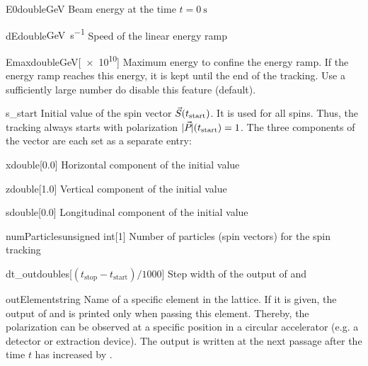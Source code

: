 \documentclass[a4paper]{scrartcl}
\begin{document}
\begin{configdoc}{E0}{double}{\si{\GeV}}
  Beam energy at the time $t=\SI{0}{\s}$
\end{configdoc}

\begin{configdoc}{dE}{double}{\si{\GeV\per\s}}
  Speed of the linear energy ramp
\end{configdoc}

\begin{configdoc}{Emax}{double}{\si{\GeV}}[\num{e10}]
  Maximum energy to confine the energy ramp.
  If the energy ramp reaches this energy, it is kept until the end of the tracking. Use a
  sufficiently large number do disable this feature (default).
\end{configdoc}

\begin{configdocgroup}{s_start}
  Initial value of the spin vector $\vec{S}_{}(t_\text{start})$. It is used for all spins.
  Thus, the tracking always starts with polarization $|\vec{P}_{}|(t_\text{start}) = 1$. The
  three components of the vector are each set as a separate entry:
  
  \begin{configdoc}{x}{double}{}[0.0]
    Horizontal component \sx of the initial value
  \end{configdoc}

  \begin{configdoc}{z}{double}{}[1.0]
    Vertical component \sz of the initial value
  \end{configdoc}

  \begin{configdoc}{s}{double}{}[0.0]
    Longitudinal component \slong of the initial value
  \end{configdoc}
\end{configdocgroup}

\begin{configdoc}{numParticles}{unsigned int}{}[1]
  Number of particles (spin vectors) for the spin tracking
\end{configdoc}

\begin{configdoc}{dt_out}{double}{\si{\s}}[$(t_\text{stop}-t_\text{start})/1000$]
  Step width of the output of \pvec and \svec[i]
\end{configdoc}

\begin{configdoc}{outElement}{string}{}
  Name of a specific element in the lattice. If it is given, the output of \pvec and
  \svec[i] is printed only when passing this element. Thereby, the polarization can be
  observed at a specific position in a circular accelerator (e.g. a detector or extraction
  device). The output is written at the next passage after the time $t$ has increased by
  .
\end{configdoc}
\end{document}
